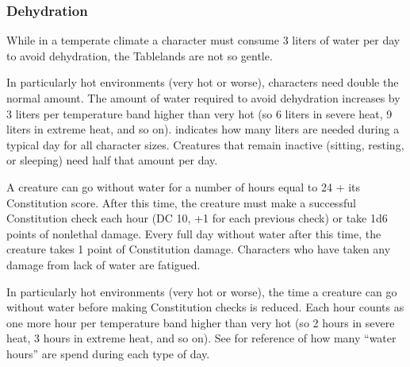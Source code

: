 \subsubsection{Dehydration}
While in a temperate climate a character must consume 3 liters of water per day to avoid dehydration, the Tablelands are not so gentle.

In particularly hot environments (very hot or worse), characters need double the normal amount. The amount of water required to avoid dehydration increases by 3 liters per temperature band higher than very hot (so 6 liters in severe heat, 9 liters in extreme heat, and so on).  indicates how many liters are needed during a typical day for all character sizes. Creatures that remain inactive (sitting, resting, or sleeping) need half that amount per day.


A creature can go without water for a number of hours equal to 24 + its Constitution score. After this time, the creature must make a successful Constitution check each hour (DC 10, +1 for each previous check) or take 1d6 points of nonlethal damage. Every full day without water after this time, the creature takes 1 point of Constitution damage. Characters who have taken any damage from lack of water are fatigued.

In particularly hot environments (very hot or worse), the time a creature can go without water before making Constitution checks is reduced. Each hour counts as one more hour per temperature band higher than very hot (so 2 hours in severe heat, 3 hours in extreme heat, and so on). See  for reference of how many ``water hours'' are spend during each type of day. 


